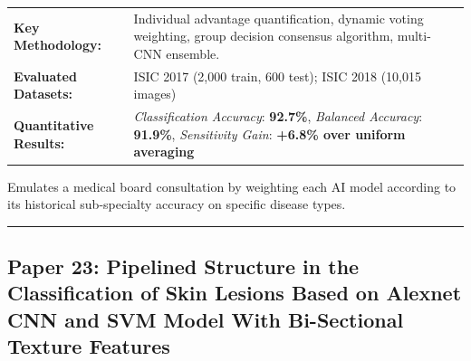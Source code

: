 \documentclass[10pt,a4paper]{article}
\begin{document}
\vspace{4pt}
\begin{tabularx}{\linewidth}{p{3.2cm}X}
\toprule
\textbf{Key Methodology:} & Individual advantage quantification, dynamic voting weighting, group decision consensus algorithm, multi-CNN ensemble. \\
\textbf{Evaluated Datasets:} & ISIC 2017 (2,000 train, 600 test); ISIC 2018 (10,015 images) \\
\textbf{Quantitative Results:} & \textit{Classification Accuracy}: \textbf{92.7\%}, \textit{Balanced Accuracy}: \textbf{91.9\%}, \textit{Sensitivity Gain}: \textbf{+6.8\% over uniform averaging} \\
\bottomrule
\end{tabularx}
\vspace{4pt}
\begin{tcolorbox}[utilitybox,title=Clinical Utility and Real-World Impact]
Emulates a medical board consultation by weighting each AI model according to its historical sub-specialty accuracy on specific disease types.
\end{tcolorbox}
\vspace{12pt}
\hrule
\vspace{12pt}
\subsection*{Paper 23: Pipelined Structure in the Classification of Skin Lesions Based on Alexnet CNN and SVM Model With Bi-Sectional Texture Features}
\end{document}
